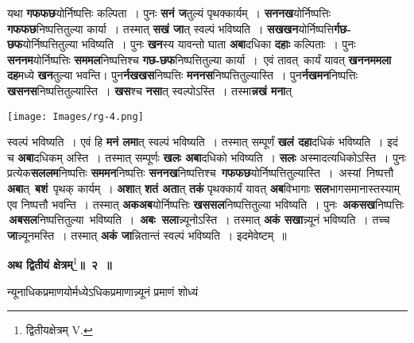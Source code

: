 \documentclass[11pt, openany]{book}
\begin{document}
\begin{flushleft}
\begin{minipage}[b]{0.55\textwidth}
\hspace{4mm}  यथा \textbf{गफफछ}योर्निष्पत्तिः कल्पिता~। पुनः \textbf{सनं ज}तुल्यं पृथक्कार्यम्~। \textbf{सननख}योर्निष्पत्तिः \textbf{गफफछ}निष्पत्तितुल्या कार्या~। तस्मात् \textbf{सखं जा}त् स्वल्पं भविष्यति~। \textbf{सखखन}योर्निष्पत्ति\textbf{र्गछ-छफ}योर्निष्पत्तितुल्या भविष्यति~। पुनः \textbf{खन}स्य यावन्तो घाता \textbf{अबा}दधिका \textbf{दहाः} कल्पिताः~। पुनः \textbf{सननम}योर्निष्पत्तिः \textbf{सममल}निष्पत्तिश्च \textbf{गछ-छफ}निष्पत्तितुल्या \;कार्या~। \,एवं \;तावत् \,कार्यं यावत् \textbf{खननममला दह}मध्ये \textbf{खन}तुल्या भवन्ति\;। पुन\textbf{र्नखखस}निष्पत्तिः \textbf{मननस}निष्पत्तितुल्यास्ति~। पुन\textbf{र्नखमन}निष्पत्तिः \textbf{खसनस}निष्पत्तितुल्यास्ति~। \textbf{खस}श्च \textbf{नसा}त् स्वल्पोऽस्ति~। तस्मा\textbf{न्नखं मना}त्
\end{minipage} 
\hfill
\begin{minipage}[b]{0.3\textwidth}
\texttt{[image: Images/rg-4.png]}
\end{minipage}
\end{flushleft}
\vspace{-3mm}

\noindent स्वल्पं भविष्यति~। एवं हि \textbf{मनं लमा}त् स्वल्पं भविष्यति~। तस्मात् \;सम्पूर्णं \;\textbf{खलं \;दहा}दधिकं  भविष्यति~। इदं च \textbf{अबा}दधिकम् अस्ति~। तस्मात् सम्पूर्णः \textbf{खलः अबा}दधिको भविष्यति~। \textbf{सलः} अस्मादत्यधिकोऽस्ति~। पुनः प्रत्येक\textbf{सललम}निष्पत्तिः \textbf{सममन}निष्पत्तिः \textbf{सननख}निष्पत्तिश्च \,\textbf{गफफछ}योर्निष्पत्तितुल्यास्ति~। \,अस्यां \,निष्पत्तौ \,\textbf{अबा}त् \,\textbf{बशं} \,पृथक् कार्यम्~। \textbf{अशा}त् \textbf{शतं अता}त् \textbf{तकं} पृथक्कार्यं यावत् \textbf{अब}विभागाः \textbf{सल}भागसमानास्तस्याम् एव निष्पत्तौ भवन्ति~। तस्मात् \textbf{अकअब}योर्निष्पत्तिः \textbf{खससल}निष्पत्तितुल्या भविष्यति~। पुनः \,\textbf{अकसख}निष्पत्तिः \,\textbf{अबसल}निष्पत्तितुल्या \,भविष्यति~। \,\textbf{अबः \,सला}न्न्यूनोऽस्ति~। तस्मात् \textbf{अकं सखा}न्न्यूनं भविष्यति~। तच्च \textbf{जा}न्न्यूनमस्ति~। तस्मात् \textbf{अकं जा}न्नितान्तं स्वल्पं भविष्यति~। इदमेवेष्टम्~॥ 
\vspace{2mm}
 
\begin{center}
\textbf{\large अथ द्वितीयं क्षेत्रम्}\renewcommand{\thefootnote}{१}\footnote{द्वितीयक्षेत्रम् {\en V.}}\;\textbf{\large ॥~२~॥}
\end{center}

{\ab न्यूनाधिकप्रमाणयोर्मध्येऽधिकप्रमाणान्न्यूनं प्रमाणं शोध्यं }
\end{document}
